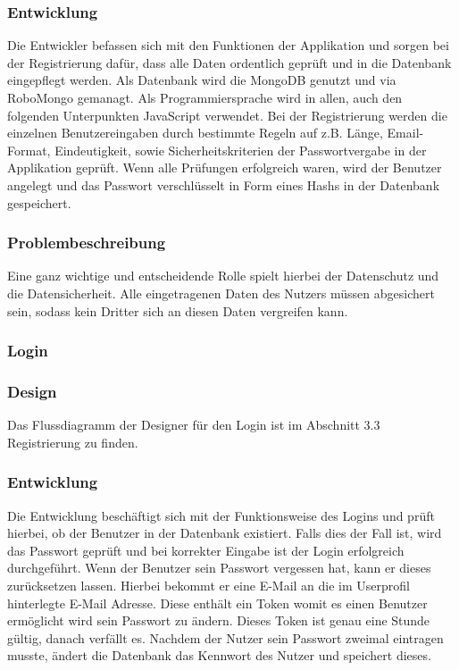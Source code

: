 \documentclass[12pt,a4paper]{article}
\begin{document}
\subsubsection*{Entwicklung}
Die Entwickler befassen sich mit den Funktionen der Applikation  und sorgen bei der Registrierung dafür, dass alle Daten ordentlich geprüft und in die Datenbank eingepflegt werden.
Als Datenbank wird die MongoDB genutzt und via RoboMongo gemanagt. Als Programmiersprache wird in allen, auch den folgenden Unterpunkten JavaScript verwendet.
Bei der Registrierung werden die einzelnen Benutzereingaben durch bestimmte Regeln auf z.B. Länge, Email-Format, Eindeutigkeit, sowie Sicherheitskriterien der Passwortvergabe in der Applikation geprüft.
Wenn alle Prüfungen erfolgreich waren, wird der Benutzer angelegt und das Passwort verschlüsselt in Form eines Hashs in der Datenbank gespeichert.
\subsubsection*{Problembeschreibung} 
Eine ganz wichtige und entscheidende Rolle spielt hierbei der Datenschutz und die Datensicherheit. Alle eingetragenen Daten des Nutzers müssen abgesichert sein, sodass kein Dritter sich an diesen Daten vergreifen kann.
\newpage
\subsubsection{Login}
\subsubsection*{Design}
Das Flussdiagramm der Designer für den Login ist im Abschnitt 3.3 Registrierung zu finden. 
\subsubsection*{Entwicklung}
Die Entwicklung beschäftigt sich mit der Funktionsweise des Logins und prüft hierbei, ob der Benutzer in der Datenbank existiert. Falls dies der Fall ist, wird das Passwort geprüft und bei korrekter Eingabe ist der Login erfolgreich durchgeführt.
Wenn der Benutzer sein Passwort vergessen hat, kann er dieses zurücksetzen lassen. Hierbei bekommt er eine E-Mail an die im Userprofil hinterlegte E-Mail Adresse. Diese enthält ein Token womit es einen Benutzer ermöglicht wird sein Passwort zu ändern. Dieses Token ist genau eine Stunde gültig, danach verfällt es. 
Nachdem der Nutzer sein Passwort zweimal eintragen musste, ändert die Datenbank das Kennwort des Nutzer und speichert dieses.
\end{document}
